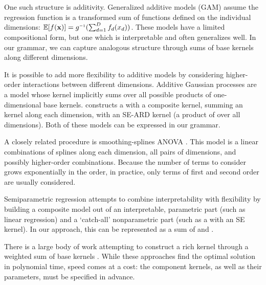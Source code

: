 One such structure is additivity.
Generalized additive models (GAM) assume the regression function is a transformed sum of functions defined on the individual dimensions: $\expect[f(\vx)] = g\inv(\sum_{d=1}^D f_d(x_d))$.
These models have a limited compositional form, but one which is interpretable and often generalizes well.
In our grammar, we can capture analogous structure through sums of base kernels along different dimensions.

It is possible to add more flexibility to additive models by considering higher-order interactions between different dimensions. 
Additive Gaussian processes \cite{duvenaud2011additive11} are a \gp{} model whose kernel implicitly sums over all possible products of one-dimensional base kernels.  
\citet{plate1999accuracy} constructs a \gp{} with a composite kernel, summing an \kSE{} kernel along each dimension, with an SE-ARD kernel (\ie a product of \kSE{} over all dimensions).
Both of these models can be expressed in our grammar.

A closely related procedure is smoothing-splines ANOVA \cite{wahba1990spline, gu2002smoothing}.
This model is a linear combinations of splines along each dimension, all pairs of dimensions, and possibly higher-order combinations.
Because the number of terms to consider grows exponentially in the order, in practice, only terms of first and second order are usually considered.

Semiparametric regression \citep[e.g.][]{ruppert2003semiparametric} attempts to combine interpretability with flexibility by building  a composite model out of an interpretable, parametric part (such as linear regression) and a `catch-all' nonparametric part (such as a \gp{} with an SE kernel).
In our approach, this can be represented as a sum of \kSE{} and \kLin{}.

There is a large body of work attempting to construct a rich kernel through a weighted sum of base kernels \citep[e.g.][]{christoudias2009bayesian, Bach_HKL}.
While these approaches find the optimal solution in polynomial time, speed comes at a cost: the component kernels, as well as their parameters, must be specified in advance.

